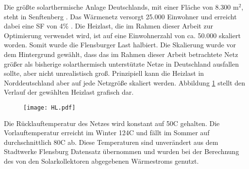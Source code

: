 Die größte solarthermische Anlage Deutschlands, mit einer Fläche von 8.300 m$^2$, steht in Senftenberg \cite{SDH2019}. Das Wärmenetz versorgt 25.000 Einwohner und erreicht dabei eine \ac{SF} von 4\% \cite{Senftenberg}. Die Heizlast, die im Rahmen dieser Arbeit zur Optimierung verwendet wird, ist auf eine Einwohnerzahl von ca. 50.000 skaliert worden. Somit wurde die Flensburger Last halbiert. Die Skalierung wurde vor dem Hintergrund gewählt, dass das im Rahmen dieser Arbeit betrachtete Netz größer als bisherige solarthermisch unterstützte Netze in Deutschland ausfallen sollte, aber nicht unrealistisch groß. Prinzipiell kann die Heizlast in Norddeutschland aber auf jede Netzgröße skaliert werden. Abbildung \ref{fig: Heizlast} stellt den Verlauf der gewählten Heizlast grafisch dar. 
	\begin{figure}[ht]
		\centering
		\texttt{[image: HL.pdf]}
		\label{fig: Heizlast}
	\end{figure}

Die Rücklauftemperatur des Netzes wird konstant auf 50\textdegree C gehalten. Die Vorlauftemperatur erreicht im Winter 124\textdegree C und fällt im Sommer auf durchschnittlich 80\textdegree C ab. Diese Temperaturen sind unverändert aus dem Stadtwerke Flensburg Datensatz übernommen und wurden bei der Berechnung des von den Solarkollektoren abgegebenen Wärmestroms genutzt.

